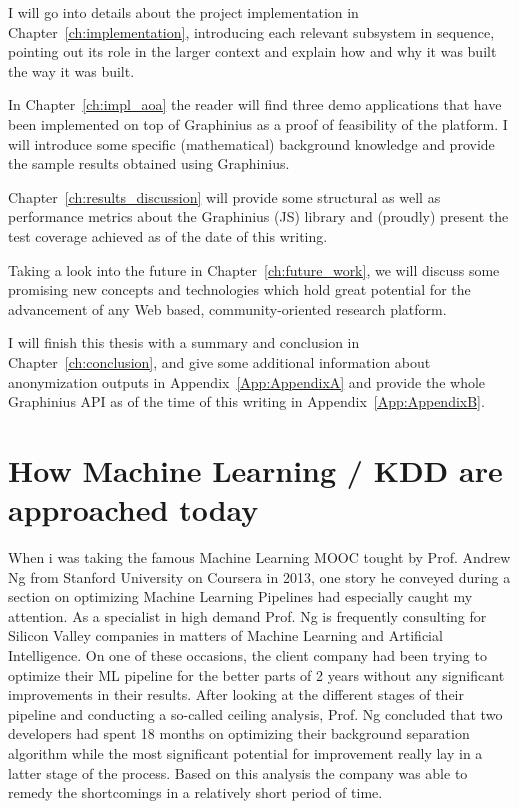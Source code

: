 I will go into details about the project implementation in Chapter~\ref{ch:implementation}, introducing each relevant subsystem in sequence, pointing out its role in the larger context and explain how and why it was built the way it was built.

In Chapter~\ref{ch:impl_aoa} the reader will find three demo applications that have been implemented on top of Graphinius as a proof of feasibility of the platform. I will introduce some specific (mathematical) background knowledge and provide the sample results obtained using Graphinius.

Chapter~\ref{ch:results_discussion} will provide some structural as well as performance metrics about the Graphinius (JS) library and (proudly) present the test coverage achieved as of the date of this writing.

Taking a look into the future in Chapter~\ref{ch:future_work}, we will discuss some promising new concepts and technologies which hold great potential for the advancement of any Web based, community-oriented research platform.

I will finish this thesis with a summary and conclusion in Chapter~\ref{ch:conclusion}, and give some additional information about anonymization outputs in Appendix~\ref{App:AppendixA} and provide the whole Graphinius API as of the time of this writing in Appendix~\ref{App:AppendixB}.


\section{How Machine Learning / KDD are approached today}
\label{sect:ml_kdd_today}

When i was taking the famous Machine Learning MOOC tought by Prof. Andrew Ng from Stanford University on Coursera in 2013, one story he conveyed during a section on optimizing Machine Learning Pipelines had especially caught my attention. As a specialist in high demand Prof. Ng is frequently consulting for Silicon Valley companies in matters of Machine Learning and Artificial Intelligence. On one of these occasions, the client company had been trying to optimize their ML pipeline for the better parts of 2 years without any significant improvements in their results. After looking at the different stages of their pipeline and conducting a so-called ceiling analysis, Prof. Ng concluded that two developers had spent 18 months on optimizing their background separation algorithm while the most significant potential for improvement really lay in a latter stage of the process. Based on this analysis the company was able to remedy the shortcomings in a relatively short period of time.

